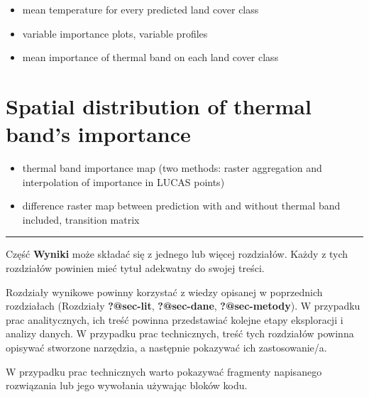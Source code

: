 \documentclass{amuthesis}
\begin{document}
\begin{itemize}
\item
  mean temperature for every predicted land cover class
\item
  variable importance plots, variable profiles
\item
  mean importance of thermal band on each land cover class
\end{itemize}

\hypertarget{sec-imp-spat}{%
\section{Spatial distribution of thermal band's
importance}\label{sec-imp-spat}}

\begin{itemize}
\item
  thermal band importance map (two methods: raster aggregation and
  interpolation of importance in LUCAS points)
\item
  difference raster map between prediction with and without thermal band
  included, transition matrix
\end{itemize}

\begin{center}\rule{0.5\linewidth}{0.5pt}\end{center}

Część \textbf{Wyniki} może składać się z jednego lub więcej rozdziałów.
Każdy z tych rozdziałów powinien mieć tytuł adekwatny do swojej treści.

Rozdziały wynikowe powinny korzystać z wiedzy opisanej w poprzednich
rozdziałach (Rozdziały \textbf{?@sec-lit}, \textbf{?@sec-dane},
\textbf{?@sec-metody}). W przypadku prac analitycznych, ich treść
powinna przedstawiać kolejne etapy eksploracji i analizy danych. W
przypadku prac technicznych, treść tych rozdziałów powinna opisywać
stworzone narzędzia, a następnie pokazywać ich zastosowanie/a.

W przypadku prac technicznych warto pokazywać fragmenty napisanego
rozwiązania lub jego wywołania używając bloków kodu.

\begin{Shaded}
\begin{Highlighting}[]
\OtherTok{=} 
  \NormalTok{)}
\NormalTok{\}}
\NormalTok{(}\NormalTok{)}
\end{Highlighting}
\end{Shaded}
\end{document}
